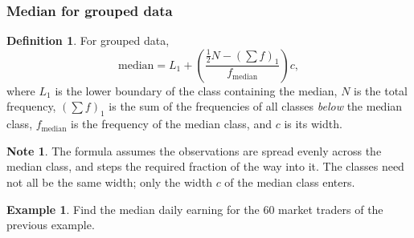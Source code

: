 \documentclass[11pt,a4paper]{article}
\theoremstyle{definition}
\newtheorem{definition}[thm]{Definition}
\newtheorem{example}[thm]{Example}
\newtheorem{note}[thm]{Note}
\begin{document}
\subsubsection{Median for grouped data}

\begin{definition}
For grouped data,
$$\text{median}=L_1+\left(\frac{\frac{1}{2}N-\left(\sum f\right)_1}{f_{\text{median}}}\right)c,$$
where $L_1$ is the lower boundary of the class containing the median, $N$ is the total
frequency, $\left(\sum f\right)_1$ is the sum of the frequencies of all classes
\emph{below} the median class, $f_{\text{median}}$ is the frequency of the median class,
and $c$ is its width.
\end{definition}

\begin{note}
The formula assumes the observations are spread evenly across the median class, and
steps the required fraction of the way into it. The classes need not all be the same
width; only the width $c$ of the median class enters.
\end{note}

\begin{example}
Find the median daily earning for the $60$ market traders of the previous example.
\end{example}
\end{document}
